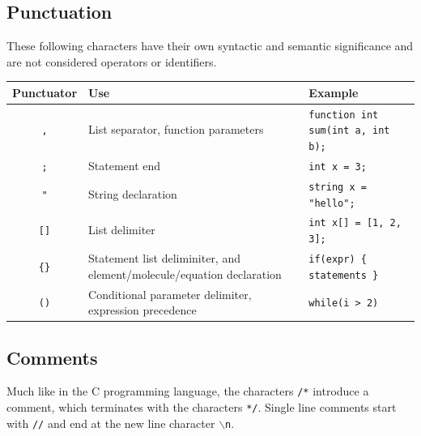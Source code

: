 \documentclass[11pt]{report}
\begin{document}
\subsection{Punctuation}
These following characters have their own syntactic and semantic significance and are not considered operators or identifiers.
\begin{center}
\begin{tabular}{ c|p{}|l }
 Punctuator & Use & Example \\
 \hline
 \texttt{,} & List separator, function parameters & \texttt{function int sum(int a, int b);} \\
 \texttt{;} & Statement end & \texttt{int x = 3;} \\
 \texttt{"} & String declaration & \texttt{string x = "hello";} \\
 \texttt{[]} & List delimiter & \texttt{int x[] = [1, 2, 3];} \\
 \texttt{\{\}} & Statement list deliminiter, and element/molecule/equation declaration & \texttt{if(expr) \{ statements \}} \\
 \texttt{()} & Conditional parameter delimiter, expression precedence & \texttt{while(i > 2)} \\
\end{tabular}
\end{center}

\subsection{Comments}
Much like in the C programming language, the characters \texttt{/*} introduce a comment, which terminates with the characters \texttt{*/}. Single line comments start with \texttt{//} and end at the new line character \texttt{$\backslash$n}.
\end{document}
